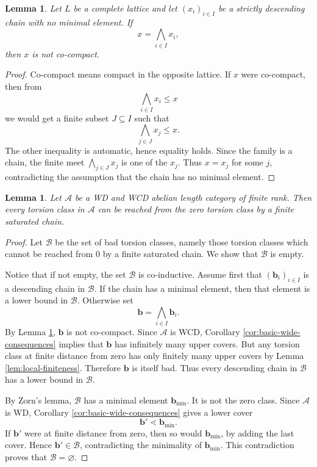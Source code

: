 \documentclass[11pt]{amsart}
\newtheorem{lemma}[theorem]{Lemma}
\theoremstyle{definition}
\newcommand{\A}{\mathcal A}
\begin{document}
\begin{lemma}\label{lem:cocompact-chain}
Let \(L\) be a complete lattice and let \((x_i)_{i\in I}\) be a strictly descending chain with no minimal element. If
\[
x=\bigwedge_{i\in I}x_i,
\]
then \(x\) is not co-compact.
\end{lemma}

\begin{proof}
Co-compact means compact in the opposite lattice. If \(x\) were co-compact, then from
\[
\bigwedge_{i\in I}x_i\leq x
\]
we would get a finite subset \(J\subseteq I\) such that
\[
\bigwedge_{j\in J}x_j\leq x.
\]
The other inequality is automatic, hence equality holds. Since the family is a chain, the finite meet \(\bigwedge_{j\in J}x_j\) is one of the \(x_j\). Thus \(x=x_j\) for some \(j\), contradicting the assumption that the chain has no minimal element.
\end{proof}

\begin{lemma}\label{lem:finite-distance}
Let \(\A\) be a WD and WCD abelian length category of finite rank. Then every torsion class in \(\A\) can be reached from the zero torsion class by a finite saturated chain.
\end{lemma}

\begin{proof}
Let \(\mathcal B\) be the set of bad torsion classes, namely those torsion classes which cannot be reached from \(0\) by a finite saturated chain. We show that \(\mathcal B\) is empty.

Notice that if not empty, the set \( \mathcal B \) is co-inductive.
Assume first that \((\mathbf b_i)_{i\in I}\) is a descending chain in \(\mathcal B\). If the chain has a minimal element, then that element is a lower bound in \(\mathcal B\). Otherwise set
\[
\mathbf b=\bigwedge_{i\in I}\mathbf b_i.
\]
By Lemma \ref{lem:cocompact-chain}, \(\mathbf b\) is not co-compact. Since \(\A\) is WCD, Corollary \ref{cor:basic-wide-consequences} implies that \(\mathbf b\) has infinitely many upper covers. But any torsion class at finite distance from zero has only finitely many upper covers by Lemma \ref{lem:local-finiteness}. Therefore \(\mathbf b\) is itself bad. Thus every descending chain in \(\mathcal B\) has a lower bound in \(\mathcal B\).

By Zorn's lemma, \(\mathcal B\) has a minimal element \(\mathbf b_{\min}\). It is not the zero class. Since \(\A\) is WD, Corollary \ref{cor:basic-wide-consequences} gives a lower cover
\[
\mathbf b'\lessdot\mathbf b_{\min}.
\]
If \(\mathbf b'\) were at finite distance from zero, then so would \(\mathbf b_{\min}\), by adding the last cover. Hence \(\mathbf b'\in\mathcal B\), contradicting the minimality of \(\mathbf b_{\min}\). This contradiction proves that \(\mathcal B=\varnothing\).
\end{proof}
\end{document}
